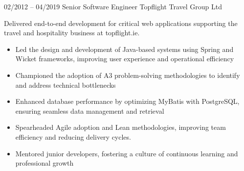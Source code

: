 \documentclass[9pt]{developercv} %
\begin{document}
\begin{entrylist}
{        }
        \entry
        {02/2012 -- 04/2019}
        {
            Senior Software Engineer
        }
        {Topflight Travel Group Ltd}
        {\vspace{-10pt}
        \begin{flushleft}
            Delivered end-to-end development for critical web applications supporting the travel and
            hospitality business at topflight.ie.
        \end{flushleft}
        \begin{itemize}[noitemsep,topsep=0pt,parsep=0pt,partopsep=0pt, leftmargin=15pt]
                
                \item Led the design and development of Java-based systems using Spring and Wicket
                frameworks, improving user experience and operational efficiency
                \item Championed the adoption of A3 problem-solving methodologies to identify and address
                technical bottlenecks
                \item Enhanced database performance by optimizing MyBatis with PostgreSQL, ensuring
                seamless data management and retrieval
                \item Spearheaded Agile adoption and Lean methodologies, improving team efficiency and
                reducing delivery cycles. 
                \item Mentored junior developers, fostering a culture of continuous
                learning and professional growth
        \end{itemize}

        }
    
    \end{entrylist}
\end{document}
